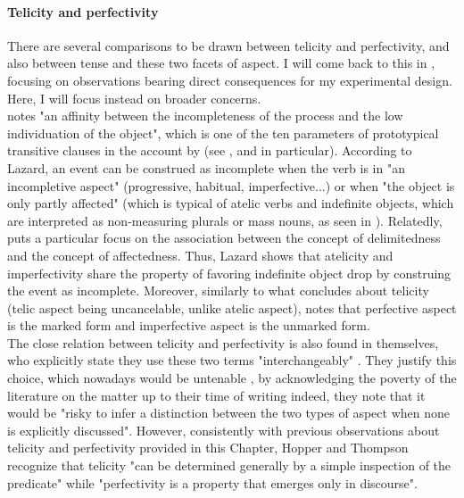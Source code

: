 \paragraph{Telicity and perfectivity}
There are several comparisons to be drawn between telicity and perfectivity, and also between tense and these two facets of aspect. I will come back to this in , focusing on observations bearing direct consequences for my experimental design. Here, I will focus instead on broader concerns.\\
\textcite[162]{Lazard2002} notes "an affinity between the incompleteness of the process and the low individuation of the object", which is one of the ten parameters of prototypical transitive clauses in the account by \textcite{HopperThompson1980} (see , and  in particular). According to Lazard, an event can be construed as incomplete when the verb is in "an incompletive aspect" (progressive, habitual, imperfective...) or when "the object is only partly affected" (which is typical of atelic verbs and indefinite objects, which are interpreted as non-measuring plurals or mass nouns, as seen in ). Relatedly, \textcite[118]{Naess2007} puts a particular focus on the association between the concept of delimitedness and the concept of affectedness. Thus, Lazard shows that atelicity and imperfectivity share the property of favoring indefinite object drop by construing the event as incomplete. Moreover, similarly to what \textcite{Olsen1997} concludes about telicity (telic aspect being uncancelable, unlike atelic aspect), \textcite{Dvorak2017thesis} notes that perfective aspect is the marked form and imperfective aspect is the unmarked form.\\
The close relation between telicity and perfectivity is also found in \textcite{HopperThompson1980} themselves, who explicitly state they use these two terms "interchangeably" \parencite[270]{HopperThompson1980}. They justify this choice, which nowadays would be untenable \parencite{bertinetto2001frequent, bertinetto-delfitto2000aspect, CivardiBertinetto2015semantics}, by acknowledging the poverty of the literature on the matter up to their time of writing \textemdash indeed, they note that it would be "risky to infer a distinction between the two types of aspect when none is explicitly discussed". However, consistently with previous observations about telicity and perfectivity provided in this Chapter, Hopper and Thompson recognize that telicity "can be determined generally by a simple inspection of the predicate" while "perfectivity is a property that emerges only in discourse".

